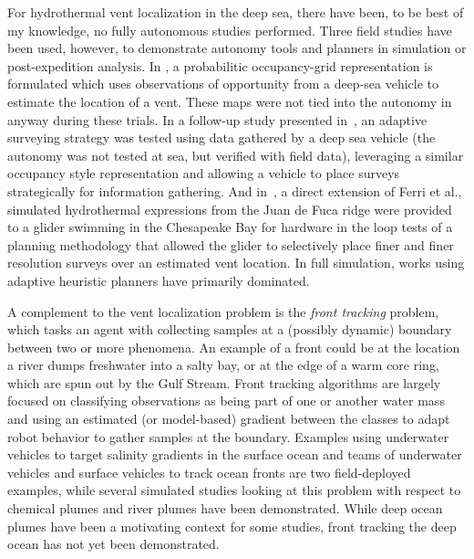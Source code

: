 For hydrothermal vent localization in the deep sea, there have been, to be best of my knowledge, no fully autonomous studies performed. Three field studies have been used, however, to demonstrate autonomy tools and planners in simulation or post-expedition analysis. In \cite{jakuba2007stochastic}, a probabilitic occupancy-grid representation is formulated which uses observations of opportunity from a deep-sea vehicle to estimate the location of a vent. These maps were not tied into the autonomy in anyway during these trials. In a follow-up study presented in~\cite{ferri2010novel}, an adaptive surveying strategy was tested using data gathered by a deep sea vehicle (the autonomy was not tested at sea, but verified with field data), leveraging a similar occupancy style representation and allowing a vehicle to place surveys strategically for information gathering. And in~\cite{branch2020demonstration}, a direct extension of Ferri et al., simulated hydrothermal expressions from the Juan de Fuca ridge were provided to a glider swimming in the Chesapeake Bay for hardware in the loop tests of a planning methodology that allowed the glider to selectively place finer and finer resolution surveys over an estimated vent location. In full simulation, works using adaptive heuristic planners\autocite{wang20203,pang2010plume} have primarily dominated.

A complement to the vent localization problem is the \emph{front tracking} problem\autocite{chen2019odor}, which tasks an agent with collecting samples at a (possibly dynamic) boundary between two or more phenomena. An example of a front could be at the location a river dumps freshwater into a salty bay\autocite{mcclimans1988estuarine}, or at the edge of a warm core ring, which are spun out by the Gulf Stream\autocite{cushman1985oscillations}. Front tracking algorithms are largely focused on classifying observations as being part of one or another water mass and using an estimated (or model-based) gradient between the classes to adapt robot behavior to gather samples at the boundary. Examples using underwater vehicles to target salinity gradients in the surface ocean\autocite{belkin2018new} and teams of underwater vehicles and surface vehicles to track ocean fronts\autocite{mccammon2021ocean} are two field-deployed examples, while several simulated studies looking at this problem with respect to chemical plumes\autocite{wang2019dynamic,li2014multi} and river plumes\autocite{teixeira20213d} have been demonstrated. While deep ocean plumes have been a motivating context for some studies, front tracking the deep ocean has not yet been demonstrated.


